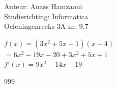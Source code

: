 \documentclass[a4paper]{article}
\begin{document}
  
\noindent \large Auteur: Anass Hamzaoui \\
\noindent \large Studierichting: Informatica \\
\noindent \large Oefeningenreeks 3A nr. 9.7\\

\medskip

\normalsize

$f(x) = (3x^2+5x+1)(x-4)$ \\

$= 6x^2 -19x -20 + 3x^2 +5x +1$ \\

$f'(x) = 9x^2 -14x -19$ \\

\begin{thebibliography}{999}
\end{thebibliography}
\end{document}
